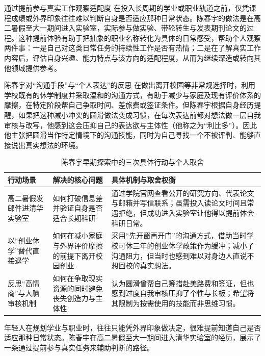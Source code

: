 \documentclass[UTF8,a4paper,11pt,fontset=fandol]{ctexart}
\begin{document}
\begin{knowledgebox}{通过提前参与真实工作观察适配度}
在投入长周期的学业或职业轨道之前，仅凭课程成绩或外界印象往往难以判断自身是否适应那种日常状态。陈春宇的做法是在高二暑假至大一期间进入实验室，实际参与做实验、带轮转生与发表期刊论文的过程。这种提前体验有助于把抽象的职业名称转化为具体的日常感受，帮助个人观察两件事：一是自己对这类日常任务的持续性工作是否有热情；二是在了解真实工作内容后，评估自身兴趣、能力特点与该方向的适配程度，从而为继续深造或转向其他领域提供参考。
\end{knowledgebox}
\begin{importantbox}{陈春宇对“沟通手段”与“个人表达”的反思}
在做出离开校园等非常规选择时，利用学校既有的休学制度并采取温和的沟通方式，有助于减少与家庭及现有评价体系的摩擦，在特定阶段帮自己争取时间、差旅费或签证条件。但陈春宇根据自身经历提醒，如果把这种减小冲突的圆滑做法变成习惯，在每次表达前都对想法做一层自我审核与改写，他感到这会压抑自己的表达欲与主体性（他称之为“利比多”）。因此他主张把圆滑当作特定情境下的沟通技能，同时为自己寻找一个不被评判、能够直接说出真实想法的环境。
\end{importantbox}
\begin{table}[H]\centering\small
\caption{陈春宇早期探索中的三次具体行动与个人取舍}
\begin{tabular}{>{\raggedright\arraybackslash}p{\dimexpr(\linewidth-6\tabcolsep)/3\relax}>{\raggedright\arraybackslash}p{\dimexpr(\linewidth-6\tabcolsep)/3\relax}>{\raggedright\arraybackslash}p{\dimexpr(\linewidth-6\tabcolsep)/3\relax}}
\toprule
行动场景 & 解决的核心问题 & 具体机制与取舍权衡\\\midrule
高二暑假发邮件进清华实验室 & 如何打破信息差并验证自身是否适合长期科研 & 通过学院官网查看公开的研究方向、代表论文与邮箱并写信联系；虽需投入读论文时间且常遇拒绝，但成功进入实验室让他得以提前体会科研日常。\\[4pt]
以“创业休学”替代直接退学 & 如何在减小家庭与外界评价摩擦的前提下离开校园创业 & 采用“先开窗再开门”的沟通方式，借助当时学校可休三年的创业休学政策作为缓冲；减小了沟通阻力，但当时也感到难以对身边人直说不想回校的真实想法。\\[4pt]
反思“高情商”与大脑审核机制 & 如何在争取现实资源的同时避免丧失创造力与主体性 & 认为圆滑曾帮自己筹措赴美路费和签证，但也感到过度自我审核压抑了个性与长板；希望将其限制为按需使用的技能而非思维习惯。\\[4pt]
\bottomrule\end{tabular}\end{table}
年轻人在规划学业与职业时，往往只能凭外界印象做决定，很难提前知道自己是否适应那种日常状态。陈春宇在高二暑假至大一期间进入清华实验室的经历，展示了一条通过提前参与真实任务来辅助判断的路径。
\end{document}

